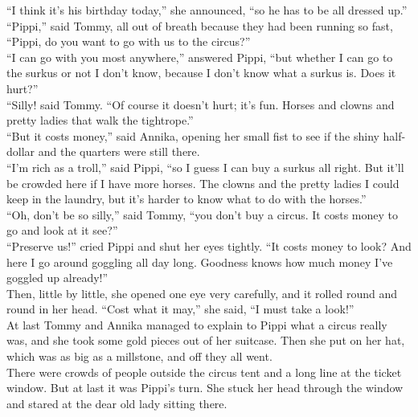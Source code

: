 \documentclass{standard}
\begin{document}
“I think it’s his birthday today,” she announced, “so he has to be all dressed up.”\\

“Pippi,” said Tommy, all out of breath because they had been running so fast, “Pippi, do you want to go with us to the circus?”\\

“I can go with you most anywhere,” answered Pippi, “but whether I can go to the surkus or not I don’t know, because I don’t know what a surkus is. Does it hurt?”\\

“Silly! said Tommy. “Of course it doesn’t hurt; it’s fun. Horses and clowns and pretty ladies that walk the tightrope.”\\

“But it costs money,” said Annika, opening her small fist to see if the shiny half-dollar and the quarters were still there.\\

“I’m rich as a troll,” said Pippi, “so I guess I can buy a surkus all right. But it’ll be crowded here if I have more horses. The clowns and the pretty ladies I could keep in the laundry, but it’s harder to know what to do with the horses.”\\

“Oh, don’t be so silly,” said Tommy, “you don’t buy a circus. It costs money to go and look at it see?”\\

“Preserve us!” cried Pippi and shut her eyes tightly. “It costs money to look? And here I go around goggling all day long. Goodness knows how much money I’ve goggled up already!”\\

Then, little by little, she opened one eye very carefully, and it rolled round and round in her head. “Cost what it may,” she said, “I must take a look!”\\

At last Tommy and Annika managed to explain to Pippi what a circus really was, and she took some gold pieces out of her suitcase. Then she put on her hat, which was as big as a millstone, and off they all went.\\

There were crowds of people outside the circus tent and a long line at the ticket window. But at last it was Pippi’s turn. She stuck her head through the window and stared at the dear old lady sitting there.\\
\end{document}
